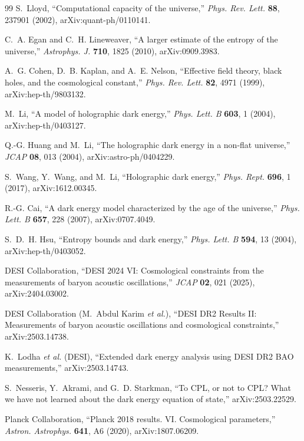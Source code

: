 \documentclass[11pt,a4paper]{article}
\begin{document}
\begin{thebibliography}{99}
S.~Lloyd, ``Computational capacity of the universe,''
\emph{Phys. Rev. Lett.} \textbf{88}, 237901 (2002), arXiv:quant-ph/0110141.

C.~A. Egan and C.~H. Lineweaver, ``A larger estimate of the entropy of the
universe,'' \emph{Astrophys. J.} \textbf{710}, 1825 (2010), arXiv:0909.3983.

A.~G. Cohen, D.~B. Kaplan, and A.~E. Nelson, ``Effective field theory, black
holes, and the cosmological constant,''
\emph{Phys. Rev. Lett.} \textbf{82}, 4971 (1999), arXiv:hep-th/9803132.

M.~Li, ``A model of holographic dark energy,''
\emph{Phys. Lett. B} \textbf{603}, 1 (2004), arXiv:hep-th/0403127.

Q.-G. Huang and M.~Li, ``The holographic dark energy in a non-flat
universe,'' \emph{JCAP} \textbf{08}, 013 (2004), arXiv:astro-ph/0404229.

S.~Wang, Y.~Wang, and M.~Li, ``Holographic dark energy,''
\emph{Phys. Rept.} \textbf{696}, 1 (2017), arXiv:1612.00345.

R.-G. Cai, ``A dark energy model characterized by the age of the universe,''
\emph{Phys. Lett. B} \textbf{657}, 228 (2007), arXiv:0707.4049.

S.~D.~H. Hsu, ``Entropy bounds and dark energy,''
\emph{Phys. Lett. B} \textbf{594}, 13 (2004), arXiv:hep-th/0403052.

DESI Collaboration, ``DESI 2024 VI: Cosmological constraints from the
measurements of baryon acoustic oscillations,''
\emph{JCAP} \textbf{02}, 021 (2025), arXiv:2404.03002.

DESI Collaboration (M.~Abdul Karim \emph{et al.}), ``DESI DR2 Results II:
Measurements of baryon acoustic oscillations and cosmological constraints,''
arXiv:2503.14738.

K.~Lodha \emph{et al.} (DESI), ``Extended dark energy analysis using DESI DR2
BAO measurements,'' arXiv:2503.14743.

S.~Nesseris, Y.~Akrami, and G.~D. Starkman, ``To CPL, or not to CPL? What we
have not learned about the dark energy equation of state,''
arXiv:2503.22529.

Planck Collaboration, ``Planck 2018 results. VI. Cosmological parameters,''
\emph{Astron. Astrophys.} \textbf{641}, A6 (2020), arXiv:1807.06209.

\end{thebibliography}
\end{document}
